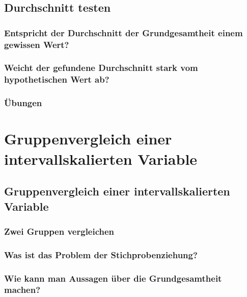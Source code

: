 \documentclass[
]{book}
\theoremstyle{definition}
\theoremstyle{definition}
\theoremstyle{definition}
\theoremstyle{definition}
\theoremstyle{remark}
\begin{document}
\chapter{Durchschnitt testen}\label{durchschnitt-testen}

\section{Entspricht der Durchschnitt der Grundgesamtheit einem gewissen Wert?}\label{entspricht-der-durchschnitt-der-grundgesamtheit-einem-gewissen-wert}

\section{Weicht der gefundene Durchschnitt stark vom hypothetischen Wert ab?}\label{weicht-der-gefundene-durchschnitt-stark-vom-hypothetischen-wert-ab}

\section{Übungen}\label{uxfcbungen-3}

\part{Gruppenvergleich einer intervallskalierten Variable}\label{part-gruppenvergleich-einer-intervallskalierten-variable}

\chapter{Gruppenvergleich einer intervallskalierten Variable}\label{gruppenvergleich-einer-intervallskalierten-variable}

\section{Zwei Gruppen vergleichen}\label{zwei-gruppen-vergleichen}

\section{Was ist das Problem der Stichprobenziehung?}\label{was-ist-das-problem-der-stichprobenziehung-1}

\section{Wie kann man Aussagen über die Grundgesamtheit machen?}\label{wie-kann-man-aussagen-uxfcber-die-grundgesamtheit-machen-1}
\end{document}
